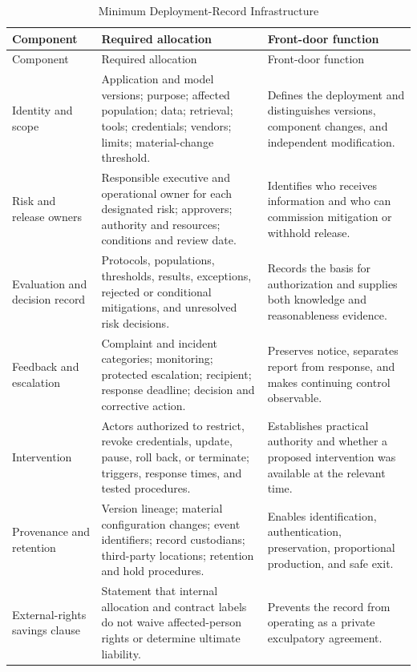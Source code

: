 \begin{longtable}{>{\raggedright\arraybackslash}p{} >{\raggedright\arraybackslash}p{} >{\raggedright\arraybackslash}p{}}
\caption{Minimum Deployment-Record Infrastructure}\label{tab:charter}\\
\toprule
Component & Required allocation & Front-door function \\
\midrule
\endfirsthead
\toprule
Component & Required allocation & Front-door function \\
\midrule
\endhead
Identity and scope & Application and model versions; purpose; affected population; data; retrieval; tools; credentials; vendors; limits; material-change threshold. & Defines the deployment and distinguishes versions, component changes, and independent modification. \\
Risk and release owners & Responsible executive and operational owner for each designated risk; approvers; authority and resources; conditions and review date. & Identifies who receives information and who can commission mitigation or withhold release. \\
Evaluation and decision record & Protocols, populations, thresholds, results, exceptions, rejected or conditional mitigations, and unresolved risk decisions. & Records the basis for authorization and supplies both knowledge and reasonableness evidence. \\
Feedback and escalation & Complaint and incident categories; monitoring; protected escalation; recipient; response deadline; decision and corrective action. & Preserves notice, separates report from response, and makes continuing control observable. \\
Intervention & Actors authorized to restrict, revoke credentials, update, pause, roll back, or terminate; triggers, response times, and tested procedures. & Establishes practical authority and whether a proposed intervention was available at the relevant time. \\
Provenance and retention & Version lineage; material configuration changes; event identifiers; record custodians; third-party locations; retention and hold procedures. & Enables identification, authentication, preservation, proportional production, and safe exit. \\
External-rights savings clause & Statement that internal allocation and contract labels do not waive affected-person rights or determine ultimate liability. & Prevents the record from operating as a private exculpatory agreement. \\
\bottomrule
\end{longtable}

